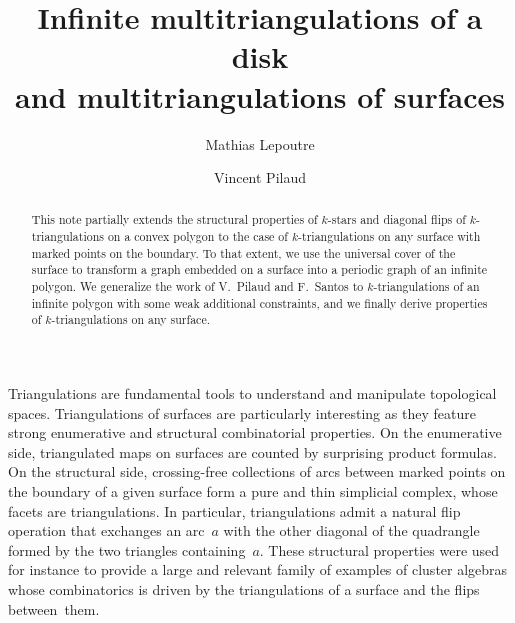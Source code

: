 \documentclass{amsart}
\title[Infinite multitriangulations of a disk and multitriangulations of surfaces]{Infinite multitriangulations of a disk \\ and multitriangulations of surfaces}
\author{Mathias Lepoutre}
\author{Vincent Pilaud}
\theoremstyle{remark}
\begin{document}
\begin{abstract}
This note partially extends the structural properties of $k$-stars and diagonal flips of $k$-triangulations on a convex polygon to the case of $k$-triangulations on any surface with marked points on the boundary. 
To that extent, we use the universal cover of the surface to transform a graph embedded on a surface into a periodic graph of an infinite polygon.
We generalize the work of V.~Pilaud and F.~Santos to $k$-triangulations of an infinite polygon with some weak additional constraints, and we finally derive properties of $k$-triangulations on any surface.
\end{abstract}

\vspace*{-.7cm}

\maketitle


Triangulations are fundamental tools to understand and manipulate topological spaces.
Triangulations of surfaces are particularly interesting as they feature strong enumerative and structural combinatorial properties.
On the enumerative side, triangulated maps on surfaces are counted by surprising product formulas. %
On the structural side, crossing-free collections of arcs between marked points on the boundary of a given surface form a pure and thin simplicial complex, whose facets are triangulations.
In particular, triangulations admit a natural flip operation that exchanges an arc~$a$ with the other diagonal of the quadrangle formed by the two triangles containing~$a$.
These structural properties were used for instance to provide a large and relevant family of examples of cluster algebras whose combinatorics is driven by the triangulations of a surface and the flips between~them.
\end{document}
